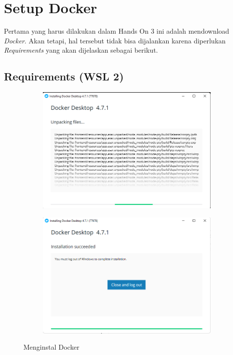 \documentclass[11pt,a4paper]{article}
\begin{document}
\section{Setup Docker}
Pertama yang harus dilakukan dalam Hands On 3 ini adalah mendownload \textit{Docker}. Akan tetapi, hal tersebut tidak bisa 
dijalankan karena diperlukan \textit{Requirements} yang akan dijelaskan sebagai berikut.
\subsection{Requirements (WSL 2)}
    \begin{figure}[h]
        \centering
        \begin{subfigure}[b]{0.4\textwidth}
            \centering
            \def\svgwidth{\columnwidth}
            \includegraphics[width=1\textwidth]{Figures/install docker2.png}
            \label{fig:nodeadlock1}
        \end{subfigure}
        \qquad %
        \begin{subfigure}[b]{0.4\textwidth}
            \centering
            \def\svgwidth{\columnwidth}
            \includegraphics[width=1\textwidth]{Figures/install docker3.png}
            \label{fig:nodeadlock2}
        \end{subfigure}
        \caption{Menginstal Docker}\label{fig:aug}
    \end{figure}
\end{document}
